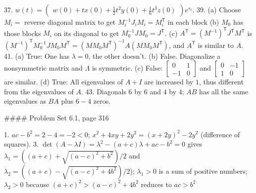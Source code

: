 37. \(w(t)=\begin{pmatrix}w(0)+tx(0)+\frac{1}{2}t^{2}y(0)+\frac{1}{6}t^{3}z(0) \end{pmatrix}e^{s_{t}}\).
39. (a) Choose \(M_{i}=\) reverse diagonal matrix to get \(M_{i}^{-1}J_{i}M_{i}=M_{i}^{\mathsf{T}}\) in each block (b) \(M_{0}\) has those blocks \(M_{i}\) on its diagonal to get \(M_{0}^{-1}JM_{0}=J^{\mathsf{T}}\). (c) \(A^{\mathsf{T}}=(M^{-1})^{\mathsf{T}}J^{\mathsf{T}}M^{\mathsf{T}}\) is \((M^{-1})^{\mathsf{T}}M_{0}^{-1}JM_{0}M^{\mathsf{T}}=(MM_{0}M^{\mathsf{T}})^{-1 }A(MM_{0}M^{\mathsf{T}})\), and \(A^{\mathsf{T}}\) is similar to \(A\).
41. (a) True: One has \(\lambda=0\), the other doesn't. (b) False. Diagonalize a nonsymmetric matrix and \(\Lambda\) is symmetric. (c) False: \(\begin{bmatrix}0&1\\ -1&0\end{bmatrix}\) and \(\begin{bmatrix}0&-1\\ 1&0\end{bmatrix}\) are similar. (d) True: All eigenvalues of \(A+I\) are increased by \(1\), thus different from the eigenvalues of \(A\).
43. Diagonals \(6\) by \(6\) and \(4\) by \(4\); \(AB\) has all the same eigenvalues as \(BA\) plus \(6-4\) zeros.

#### Problem Set 6.1, page 316

1. \(ac-b^{2}=2-4=-2<0\); \(x^{2}+4xy+2y^{2}=(x+2y)^{2}-2y^{2}\) (difference of squares).
3. \(\det{(A-\lambda I)}=\lambda^{2}-(a+c)\lambda+ac-b^{2}=0\) gives \(\lambda_{1}=((a+c)+\sqrt{(a-c)^{2}+b^{2}})/2\) and \(\lambda_{2}=((a+c)-\sqrt{(a-c)^{2}+4b^{2}})/2\)); \(\lambda_{1}>0\) is a sum of positive numbers; \(\lambda_{2}>0\) because \((a+c)^{2}>(a-c)^{2}+4b^{2}\) reduces to \(ac>b^{2}\) 